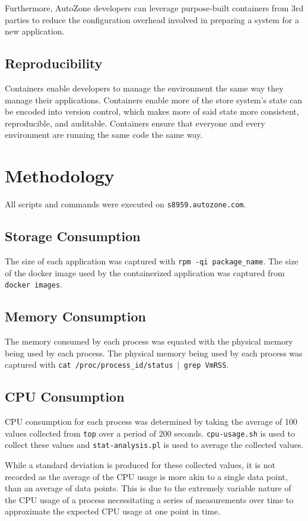 \documentclass{article}
\begin{document}
Furthermore, AutoZone developers can leverage purpose-built containers from 3rd parties to reduce the configuration overhead involved in preparing a system for a new application. 

\subsection{Reproducibility}
Containers enable developers to manage the environment the same way they manage their applications. Containers enable more of the store system's state can be encoded into version control, which makes more of said state more consistent, reproducible, and auditable. Containers ensure that everyone and every environment are running the same code the same way.

\section{Methodology}
All scripts and commands were executed on \texttt{s8959.autozone.com}.

\subsection{Storage Consumption}
The size of each application was captured with \texttt{rpm -qi package\_name}. The size of the docker image used by the containerized application was captured from \texttt{docker images}.

\subsection{Memory Consumption}
The memory consumed by each process was equated with the physical memory being used by each process. The physical memory being used by each process was captured with \texttt{cat /proc/process\_id/status $|$ grep VmRSS}.

\subsection{CPU Consumption}
CPU consumption for each process was determined by taking the average of 100 values collected from \texttt{top} over a period of 200 seconds. \texttt{cpu-usage.sh} is used to collect these values and \texttt{stat-analysis.pl} is used to average the collected values.

While a standard deviation is produced for these collected values, it is not recorded as the average of the CPU usage is more akin to a single data point, than an average of data points. This is due to the extremely variable nature of the CPU usage of a process necessitating a series of measurements over time to approximate the expected CPU usage at one point in time.
\end{document}
